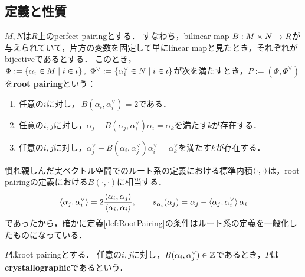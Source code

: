 \subsection{定義と性質} \label{sec:def_and_properties_of_RootPairing}

\begin{definition}
  \label{def:RootPairing}
  \leanok
  $M, N$は$R$上のperfect pairingとする．
  すなわち，bilinear map $B : M \times N \rightarrow R$が与えられていて，片方の変数を固定して単にlinear mapと見たとき，それぞれがbijectiveであるとする．
  このとき，$\Phi := \set{\alpha_i \in M}{i \in \iota},\ \Phi^\vee := \set{\alpha^\vee_i \in N}{i \in \iota}$が次を満たすとき，$P := (\Phi, \Phi^\vee)$を\textbf{root pairing}という：
  \begin{enumerate}[label=(\roman*)]
    \item 任意の$i$に対し，$\ B(\alpha_i, \alpha^\vee_i) = 2$である． \label{def:RootPairing_EqTwo}
    \item 任意の$i, j$に対し，$\alpha_j - B(\alpha_j, \alpha^\vee_i) \alpha_i = \alpha_k$を満たす$k$が存在する．
    \item 任意の$i, j$に対し，$\alpha^\vee_j - B(\alpha_i, \alpha^\vee_j) \alpha^\vee_i = \alpha^\vee_k$を満たす$k$が存在する．
  \end{enumerate}
\end{definition}

\begin{remark}
  慣れ親しんだ実ベクトル空間でのルート系の定義における標準内積$\left\langle \cdot, \cdot \right\rangle$は，root pairingの定義における$B(\cdot, \cdot)$に相当する．
  \begin{equation}
  \left\langle \alpha_j, \alpha_i^\vee \right\rangle = 2 \frac{\left\langle \alpha_i, \alpha_j \right\rangle}{\left\langle \alpha_i, \alpha_i \right\rangle},\qquad
  s_{\alpha_i}(\alpha_j) = \alpha_j - \left\langle \alpha_j, \alpha_i^\vee \right\rangle \alpha_i
  \end{equation}
  であったから，確かに定義\ref{def:RootPairing}の条件はルート系の定義を一般化したものになっている．
  
\end{remark}

\begin{definition}
  \label{def:RootPairing.IsCrystallographic}
  \leanok
  $P$はroot pairingとする．
  任意の$i, j$に対し，$B(\alpha_i, \alpha^\vee_j) \in \mathbb{Z}$であるとき，$P$は\textbf{crystallographic}であるという．
\end{definition}

